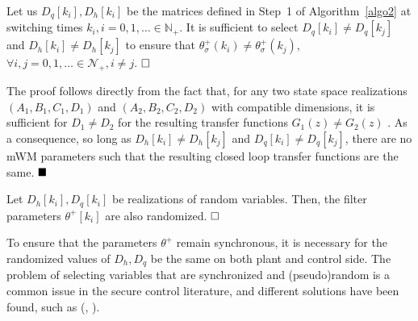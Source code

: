 \begin{theorem}\label{thm:nonRepeat}
    Let us $D_q[k_i],D_h[k_i]$ be the matrices defined in Step~1 of Algorithm~\ref{algo2} at switching times $k_i, i = 0,1,\dots \in \mathbb{N}_+$. It is sufficient to select $D_q[k_i] \neq D_q[k_j]$ and $D_h[k_i] \neq D_h[k_j]$ to ensure that $\theta_\sigma^+(k_i) \neq \theta_\sigma^+(k_j)$, $\forall i,j = 0,1,\dots \in \mathcal N_+, i \neq j$. 
    $\hfill\square$
\end{theorem}
\begin{pf}
    The proof follows directly from the fact that, for any two state space realizations $(A_1,B_1,C_1,D_1)$ and $(A_2,B_2,C_2,D_2)$ with compatible dimensions, it is sufficient for $D_1 \neq D_2$ for the resulting transfer functions $G_1(z) \neq G_2(z)$ \cite[Th. 4.1]{chen1984linear}.
    As a consequence, so long as $D_h[k_i] \neq D_h[k_j]$ and $D_q[k_i] \neq D_q[k_j]$, there are no mWM parameters such that the resulting closed loop transfer functions are the same.
    $\hfill\blacksquare$
\end{pf}


\begin{corollary}
    Let $D_h[k_i], D_q[k_i]$ be realizations of random variables. Then, the filter parameters $\theta^+[k_i]$ are also randomized.
    $\hfill\square$
\end{corollary}

To ensure that the parameters $\theta^+$ remain synchronous, it is necessary for the randomized values of $D_h, D_q$ be the same on both plant and control side.
The problem of selecting variables that are synchronized and (pseudo)random is a common issue in the secure control literature, and different solutions have been found, such as (\cite{zhang2022sensor}, \cite{zhang2023hybrid}).